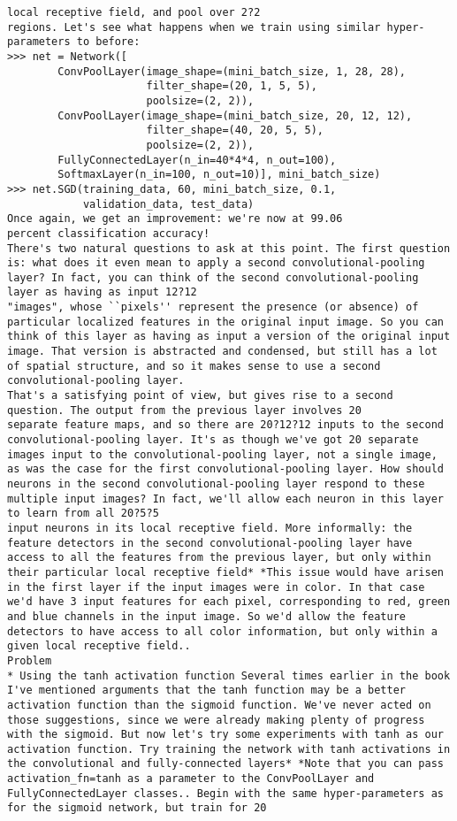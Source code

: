 \begin{lstlisting}
local receptive field, and pool over 2?2
regions. Let's see what happens when we train using similar hyper-parameters to before:
>>> net = Network([
        ConvPoolLayer(image_shape=(mini_batch_size, 1, 28, 28), 
                      filter_shape=(20, 1, 5, 5), 
                      poolsize=(2, 2)),
        ConvPoolLayer(image_shape=(mini_batch_size, 20, 12, 12), 
                      filter_shape=(40, 20, 5, 5), 
                      poolsize=(2, 2)),
        FullyConnectedLayer(n_in=40*4*4, n_out=100),
        SoftmaxLayer(n_in=100, n_out=10)], mini_batch_size)
>>> net.SGD(training_data, 60, mini_batch_size, 0.1, 
            validation_data, test_data)        
Once again, we get an improvement: we're now at 99.06
percent classification accuracy!
There's two natural questions to ask at this point. The first question is: what does it even mean to apply a second convolutional-pooling layer? In fact, you can think of the second convolutional-pooling layer as having as input 12?12
"images", whose ``pixels'' represent the presence (or absence) of particular localized features in the original input image. So you can think of this layer as having as input a version of the original input image. That version is abstracted and condensed, but still has a lot of spatial structure, and so it makes sense to use a second convolutional-pooling layer.
That's a satisfying point of view, but gives rise to a second question. The output from the previous layer involves 20
separate feature maps, and so there are 20?12?12 inputs to the second convolutional-pooling layer. It's as though we've got 20 separate images input to the convolutional-pooling layer, not a single image, as was the case for the first convolutional-pooling layer. How should neurons in the second convolutional-pooling layer respond to these multiple input images? In fact, we'll allow each neuron in this layer to learn from all 20?5?5
input neurons in its local receptive field. More informally: the feature detectors in the second convolutional-pooling layer have access to all the features from the previous layer, but only within their particular local receptive field* *This issue would have arisen in the first layer if the input images were in color. In that case we'd have 3 input features for each pixel, corresponding to red, green and blue channels in the input image. So we'd allow the feature detectors to have access to all color information, but only within a given local receptive field..
Problem
* Using the tanh activation function Several times earlier in the book I've mentioned arguments that the tanh function may be a better activation function than the sigmoid function. We've never acted on those suggestions, since we were already making plenty of progress with the sigmoid. But now let's try some experiments with tanh as our activation function. Try training the network with tanh activations in the convolutional and fully-connected layers* *Note that you can pass activation_fn=tanh as a parameter to the ConvPoolLayer and FullyConnectedLayer classes.. Begin with the same hyper-parameters as for the sigmoid network, but train for 20

\end{lstlisting}
